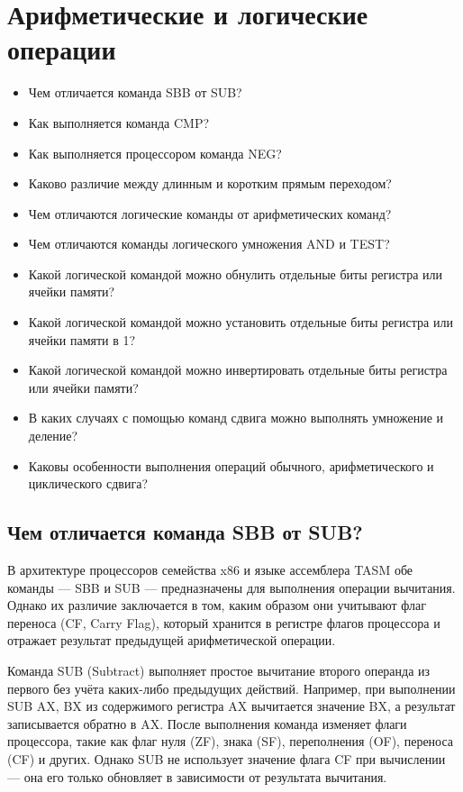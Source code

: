 \chapter{Арифметические и логические операции}
\begin{itemize}
\item Чем отличается команда SBB от SUB?
\item Как выполняется команда CMP?
\item Как выполняется процессором команда NEG?
\item Каково различие между длинным и коротким прямым переходом?
\item Чем отличаются логические команды от арифметических команд?
\item Чем отличаются команды логического умножения AND и TEST?
\item Какой логической командой можно обнулить отдельные биты регистра или ячейки памяти?
\item Какой логической командой можно установить отдельные биты регистра или ячейки памяти в 1?
\item Какой логической командой можно инвертировать отдельные биты регистра или ячейки памяти?
\item В каких случаях с помощью команд сдвига можно выполнять умножение и деление?
\item Каковы особенности выполнения операций обычного, арифметического и циклического сдвига?
\end{itemize}

\section{Чем отличается команда SBB от SUB?}

В архитектуре процессоров семейства x86 и языке ассемблера TASM обе команды — SBB и SUB — предназначены для выполнения операции вычитания.
Однако их различие заключается в том, каким образом они учитывают флаг переноса (CF, Carry Flag), который хранится в регистре флагов процессора и отражает результат предыдущей арифметической операции.

Команда SUB (Subtract) выполняет простое вычитание второго операнда из первого без учёта каких-либо предыдущих действий.
Например, при выполнении SUB AX, BX из содержимого регистра AX вычитается значение BX, а результат записывается обратно в AX.
После выполнения команда изменяет флаги процессора, такие как флаг нуля (ZF), знака (SF), переполнения (OF), переноса (CF) и других.
Однако SUB не использует значение флага CF при вычислении — она его только обновляет в зависимости от результата вычитания.

